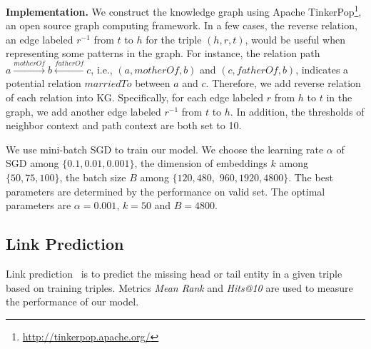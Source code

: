 \textbf{Implementation.}
We construct the knowledge graph using Apache TinkerPop\footnote{\url{http://tinkerpop.apache.org/}}, an open source graph computing framework. In a few cases, the reverse relation, an edge labeled $r^{-1}$ from $t$ to $h$ for the triple $(h,r,t)$, would be useful when representing some patterns in the graph. For instance, the relation path $a \xrightarrow{motherOf} b \xleftarrow{fatherOf} c$, i.e., $(a, motherOf, b)$ and $(c, fatherOf, b)$, indicates a potential relation $marriedTo$ between $a$ and $c$. Therefore, we add reverse relation of each relation into KG. Specifically, for each edge labeled $r$ from $h$ to $t$ in the graph, we add another edge labeled $r^{-1}$ from $t$ to $h$. In addition, the thresholds of neighbor context and path context are both set to 10.



We use mini-batch SGD to train our model. We choose the learning rate $\alpha$ of SGD among $\{0.1, 0.01, 0.001\}$, the dimension of embeddings $k$ among $\{50, 75, 100\}$, the batch size $B$ among $\{120, 480,$ $ 960, 1920, 4800\}$. The best parameters are determined by the performance on valid set. The optimal parameters are $\alpha=0.001$, $k=50$ and $B=4800$.

\subsection{Link Prediction}
Link prediction~\cite{BordesUGWY13} is to predict the missing head or tail entity in a given triple based on training triples. Metrics \textit{Mean Rank} and \textit{Hits@10} are used to measure the performance of our model.


